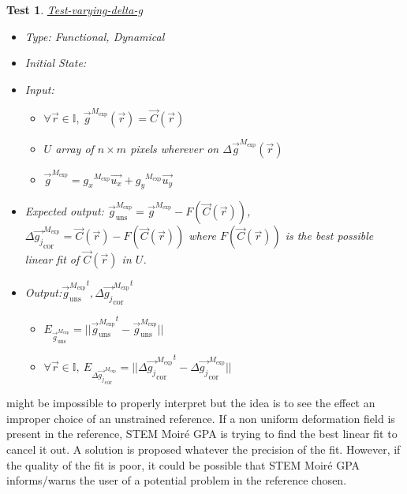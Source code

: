 \documentclass[12pt, titlepage]{article}
\newcommand{\progname}{STEM Moir{\'e} GPA}
\newtheorem{Test}{Test}
\begin{document}
\begin{Test}\normalfont\underline{Test-varying-delta-g}
\label{T_varying-delta-g}
\begin{itemize}
\item Type: Functional, Dynamical
\item Initial State: 
\item Input: 
	\begin{itemize}
	\item $\forall \vec{r} \in \mathbb{I}, \ \overrightarrow{g}^{M_{\text{exp}}}(\vec{r})=\overrightarrow{C}(\vec{r})$
	\item $U$ array of $n \times m$ pixels wherever on $\Delta \overrightarrow{g}^{M_{\text{exp}}}(\vec{r})$
	\item $\overrightarrow{g}^{M_{\text{exp}}}={g_x}^{M_{\text{exp}}}\overrightarrow{u_x}+{g_y}^{M_{\text{exp}}}\overrightarrow{u_y}$
\end{itemize}
\item Expected output: $\overrightarrow{g}_{\text{uns}}^{M_{\text{exp}}}=\overrightarrow{g}^{M_{\text{exp}}}-F(\overrightarrow{C}(\vec{r}))$,   $\Delta\overrightarrow{g_{j}}_{\text{cor}}^{M_{\text{exp}}}=\overrightarrow{C}(\vec{r})-F(\overrightarrow{C}(\vec{r}))$ where $F(\overrightarrow{C}(\vec{r}))$ is the best possible linear fit of $\overrightarrow{C}(\vec{r})$ in $U$.
\item Output:${\overrightarrow{g}_{\text{uns}}^{M_{\text{exp}}}}^{t}, {\Delta\overrightarrow{g_{j}}_{\text{cor}}^{M_{\text{exp}}}}^{t}$
	\begin{itemize}
	\item $E_{\overrightarrow{g}_{\text{uns}}^{M_{\text{exp}}}}=||{\overrightarrow{g}_{\text{uns}}^{M_{\text{exp}}}}^{t}-\overrightarrow{g}_{\text{uns}}^{M_{\text{exp}}}||$
	\item $\forall \vec{r} \in \mathbb{I}, \ E_{\Delta\overrightarrow{g_{j}}_{\text{cor}}^{M_{\text{exp}}}}=||{\Delta\overrightarrow{g_{j}}_{\text{cor}}^{M_{\text{exp}}}}^{t}-\Delta\overrightarrow{g_{j}}_{\text{cor}}^{M_{\text{exp}}}||$
	\end{itemize}
\end{itemize}
\end{Test}

 might be impossible to properly interpret but the idea is to see the effect an improper choice of an unstrained reference. If a non uniform deformation field is present in the reference, \progname{} is trying to find the best linear fit to cancel it out. A solution is proposed whatever the precision of the fit. However, if the quality of the fit is poor, it could be possible that \progname{} informs/warns the user of a potential problem in the reference chosen.
\end{document}
